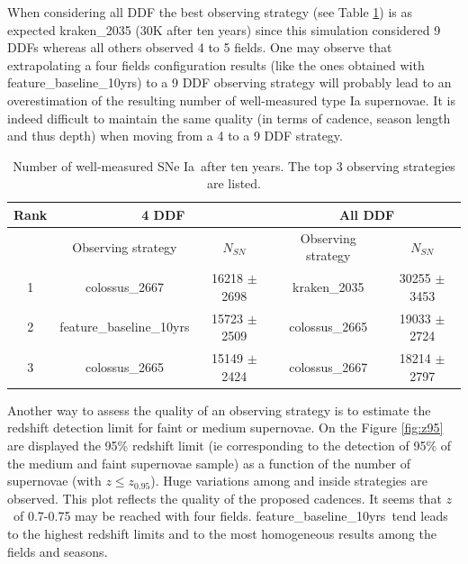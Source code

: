 \documentclass[a4paper,10pt]{article}
\newcommand{\feature}{feature\_baseline\_10yrs}
\newcommand{\redshift}{$z$}
\newcommand{\sne}{{SNe Ia}}
\begin{document}
When considering all DDF the best observing strategy (see Table \ref{tab:ddf_nsn}) is as expected kraken\_2035 (30K after ten years) since this simulation considered 9 DDFs whereas all others observed 4 to 5 fields. One may observe that extrapolating a four fields configuration results (like the ones obtained with \feature) to a 9 DDF observing strategy will probably lead to an overestimation of the resulting number of well-measured type Ia supernovae. It is indeed difficult to maintain the same quality (in terms of cadence, season length and thus depth) when moving from a 4 to a 9 DDF strategy.

\begin{table}[!htbp]
  \caption{Number of well-measured \sne~after ten years. The top 3 observing strategies are listed.}\label{tab:ddf_nsn}
  \begin{center}
  \begin{tabular}{c|cc||cc}
    \hline
    \hline
    Rank & \multicolumn{2}{c}{4 DDF} & \multicolumn{2}{c}{All DDF} \\
    \hline
    
     & Observing strategy & $N_{SN}$ & Observing strategy & $N_{SN}$ \\
     \hline
     1 & colossus\_2667 & 16218 $\pm$ 2698 & kraken\_2035 & 30255 $\pm$ 3453 \\
     2 & \feature & 15723 $\pm$ 2509 & colossus\_2665 & 19033 $\pm$ 2724 \\
     3 & colossus\_2665 & 15149 $\pm$ 2424 & colossus\_2667 & 18214 $\pm$ 2797 \\
    \hline
  \end{tabular}
 
  \end{center}
\end{table}

Another way to assess the quality of an observing strategy is to estimate the redshift detection limit for faint or medium supernovae. On the Figure \ref{fig:z95} are  displayed the 95\% redshift limit (ie corresponding to the detection of 95\% of the medium and faint supernovae sample) as a function of the number of supernovae (with  $z\leq z_{0.95}$). Huge variations among and inside strategies are observed. This plot reflects the quality of the proposed cadences. It seems that \redshift~of 0.7-0.75 may be reached with four fields. \feature~tend leads to the highest redshift limits and to the most homogeneous results among the fields and seasons. 

\newpage
\end{document}
